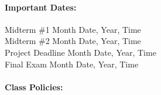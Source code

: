 \documentclass[11pt, a4paper]{article}
\begin{document}
\paragraph{Important Dates:}
\begin{center} \begin{minipage}{3.8in}
\begin{flushleft}
Midterm \#1      \dotfill Month Date, Year, Time  \\
Midterm \#2      \dotfill Month Date, Year, Time  \\
Project Deadline      \dotfill Month Date, Year, Time  \\
Final Exam      \dotfill Month Date, Year, Time  \\
\end{flushleft}
\end{minipage}
\end{center}

\paragraph{Class Policies:}  
\end{document}
